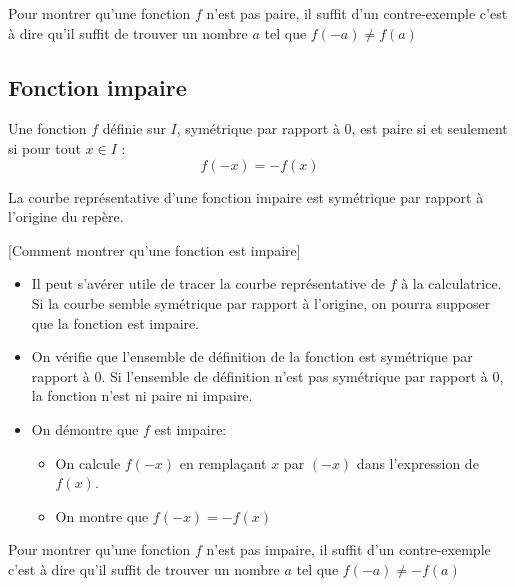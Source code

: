 \begin{rem}{}{}
Pour montrer qu'une fonction $f$ n'est pas paire, il suffit d'un contre-exemple c'est à dire qu'il suffit de trouver un nombre $a$ tel que $f\left(-a\right)\neq f\left(a\right)$
\end{rem}

\vspace{-2mm}
\subsection{Fonction impaire}

\vspace{-1mm}
\begin{defi}{}{}
Une fonction $f$ définie sur $I$, symétrique par rapport à $0$, est paire si et seulement si pour tout $x \in I$ : $$f(-x)=-f(x)$$
\end{defi}

\begin{prop}{}{}
La courbe représentative d'une fonction impaire est symétrique par rapport à l'origine du repère.
\end{prop}

\begin{methode}{}{}[Comment montrer qu'une fonction est impaire]
\begin{itemize}
\item Il peut s'avérer utile de tracer la courbe représentative de $f$ à la calculatrice.
Si la courbe semble symétrique par rapport à l'origine, on pourra supposer que la fonction est impaire.

\item On vérifie que l'ensemble de définition de la fonction est symétrique par rapport à 0. Si l'ensemble de définition n'est pas symétrique par rapport à 0, la fonction n'est ni paire ni impaire.

\item On démontre que $f$ est impaire:
\begin{itemize}
\item  On calcule $f\left(-x\right)$ en remplaçant $x$ par $\left(-x\right)$ dans l'expression de $f\left(x\right)$.
\item  On montre que $f\left(-x\right)=-f\left(x\right)$
\end{itemize}
\end{itemize}
\end{methode}

\begin{rem}{}{}
Pour montrer qu'une fonction $f$ n'est pas impaire, il suffit d'un contre-exemple c'est à dire qu'il suffit de trouver un nombre $a$ tel que $f\left(-a\right)\neq -f\left(a\right)$
\end{rem}